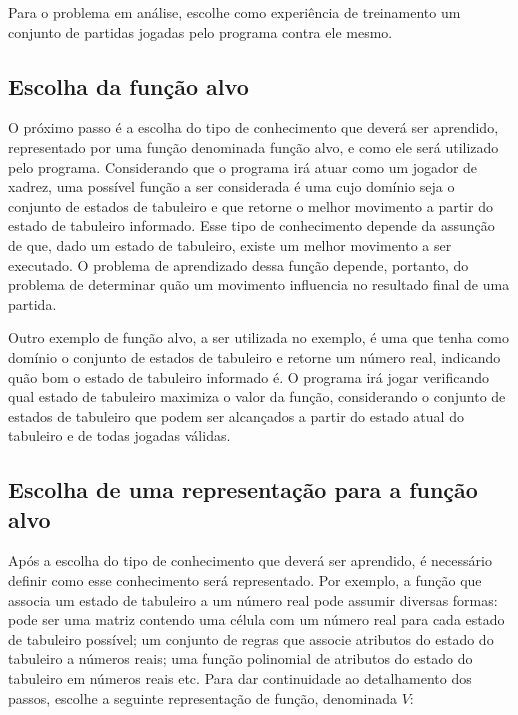 Para o problema em análise, \cite{Tom_mitchell} escolhe como experiência de treinamento um conjunto de partidas jogadas pelo programa contra ele mesmo.

\subsection*{Escolha da função alvo}

O próximo passo é a escolha do tipo de conhecimento que deverá ser aprendido, representado por uma função denominada função alvo, e como ele será utilizado pelo programa. Considerando que o programa irá atuar como um jogador de xadrez, uma possível função a ser considerada é uma cujo domínio seja o conjunto de estados de tabuleiro e que retorne o melhor movimento a partir do estado de tabuleiro informado. Esse tipo de conhecimento depende da assunção de que, dado um estado de tabuleiro, existe um melhor movimento a ser executado. O problema de aprendizado dessa função depende, portanto, do problema de determinar quão um movimento influencia no resultado final de uma partida. 

Outro exemplo de função alvo, a ser utilizada no exemplo, é uma que tenha como domínio o conjunto de estados de tabuleiro e retorne um número real, indicando quão bom o estado de tabuleiro informado é. O programa irá jogar verificando qual estado de tabuleiro maximiza o valor da função, considerando o conjunto de estados de tabuleiro que podem ser alcançados a partir do estado atual do tabuleiro e de todas jogadas válidas.

\subsection*{Escolha de uma representação para a função alvo}

Após a escolha do tipo de conhecimento que deverá ser aprendido, é necessário definir como esse conhecimento será representado. Por exemplo, a função que associa um estado de tabuleiro a um número real pode assumir diversas formas: pode ser uma matriz contendo uma célula com um número real para cada estado de tabuleiro possível; um conjunto de regras que associe atributos do estado do tabuleiro a números reais; uma função polinomial de atributos do estado do tabuleiro em números reais etc. Para dar continuidade ao detalhamento dos passos, \cite{Tom_mitchell} escolhe a seguinte representação de função, denominada $V$:

